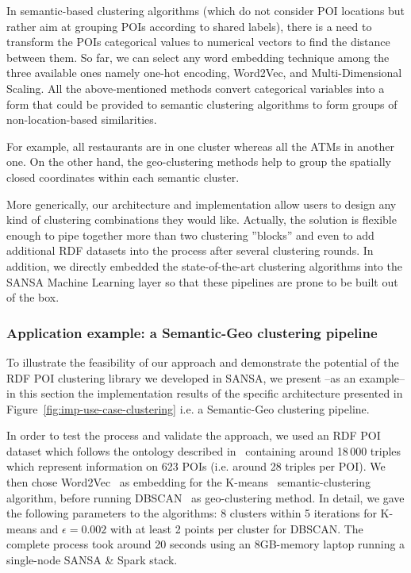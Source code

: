 In semantic-based clustering algorithms (which do not consider \gls{POI} locations but rather aim at grouping \gls{POI}s according to shared labels), there is a need to transform the \gls{POI}s categorical values to numerical vectors to find the distance between them. 
So far, we can select any word embedding technique among the three available ones namely one-hot encoding, Word2Vec, and Multi-Dimensional Scaling.
All the above-mentioned methods convert categorical variables into a form that could be provided to semantic clustering algorithms to form groups of non-location-based similarities.

For example, all restaurants are in one cluster whereas all the ATMs in another one.
On the other hand, the geo-clustering methods help to group the spatially closed coordinates within each semantic cluster.

More generically, our architecture and implementation allow users to design any kind of clustering combinations they would like. Actually, the solution is flexible enough to pipe together more than two clustering ''blocks'' and even to add additional \gls{RDF} datasets into the process after several clustering rounds. 
In addition, we directly embedded the state-of-the-art clustering algorithms into the SANSA Machine Learning layer so that these pipelines are prone to be built out of the box.


\subsubsection{Application example: a Semantic-Geo clustering pipeline}
To illustrate the feasibility of our approach and demonstrate the potential of the \gls{RDF} \gls{POI} clustering library we developed in SANSA, we present --as an example-- in this section the implementation results of the specific architecture presented in Figure~\ref{fig:imp-use-case-clustering} i.e. a Semantic-Geo clustering pipeline.

In order to test the process and validate the approach, we used an \gls{RDF} \gls{POI} dataset which follows the ontology described in~\cite{Athanasiou2019BigPD} containing around 18\,000 triples which represent information on 623 \gls{POI}s (i.e. around 28 triples per \gls{POI}). 
We then chose Word2Vec~\cite{mikolov2013distributed} as embedding for the K-means~\cite{kmeans-algo} semantic-clustering algorithm, before running DBSCAN~\cite{ester1996density} as geo-clustering method. 
In detail, we gave the following parameters to the algorithms: 8 clusters within 5 iterations for K-means and $\epsilon=0.002$ with at least 2 points per cluster for DBSCAN.
The complete process took around 20 seconds using an 8GB-memory laptop running a single-node SANSA \& Spark stack.

